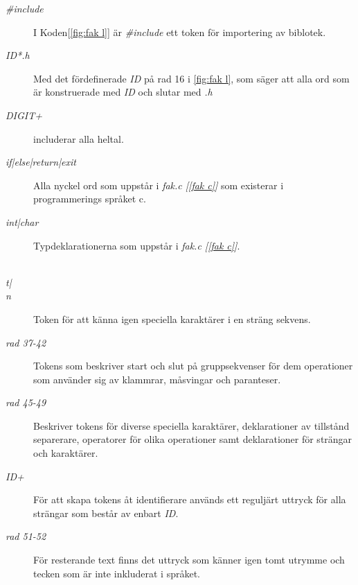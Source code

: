 \begin{description}

\item[\textit{\#include}] I Koden[\ref{fig:fak l}] är \textit{\#include} ett token för importering av biblotek. 

\item[\textit{{ID}*.h}] Med det fördefinerade \textit{ID} på rad 16 i
\ref{fig:fak l}, som säger att alla ord som är konstruerade med \textit{ID} och slutar
med \textit{.h}

\item[\textit{{DIGIT}+}] includerar alla heltal.

\item[\textit{if|else|return|exit}] Alla nyckel ord som uppstår i \textit{fak.c [\ref{fak c}] }
som existerar i programmerings språket c.

\item[\textit{int|char}] Typdeklarationerna som uppstår i \textit{fak.c [\ref{fak c}]}. 

\item[\textit{\\t|\\n}] Token för att känna igen speciella karaktärer i en sträng sekvens.

\item[\textit{rad 37-42}] Tokens som beskriver start och slut på gruppsekvenser för dem
operationer som använder sig av klammrar, måsvingar och paranteser.

\item[\textit{rad 45-49}] Beskriver tokens för diverse speciella karaktärer, deklarationer av
tillstånd separerare, operatorer för olika operationer samt deklarationer för strängar och
karaktärer.

\item[\textit{{ID}+}] För att skapa tokens åt identifierare används ett reguljärt uttryck för alla strängar som
består av enbart \textit{ID}.

\item[\textit{rad 51-52}] För resterande text finns det uttryck som känner igen tomt utrymme och
tecken som är inte inkluderat i språket.


\end{description}
